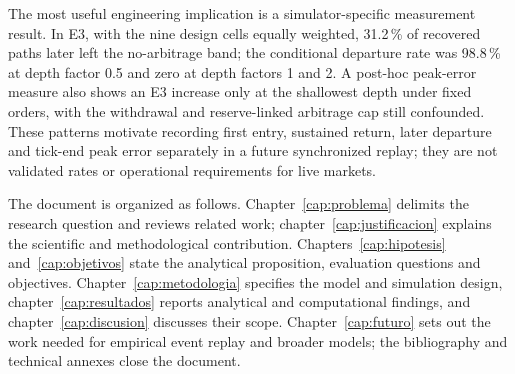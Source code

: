 The most useful engineering implication is a simulator-specific measurement result. In E3, with the nine design cells equally weighted, 31.2\,\% of recovered paths later left the no-arbitrage band; the conditional departure rate was 98.8\,\% at depth factor 0.5 and zero at depth factors 1 and 2. A post-hoc peak-error measure also shows an E3 increase only at the shallowest depth under fixed orders, with the withdrawal and reserve-linked arbitrage cap still confounded. These patterns motivate recording first entry, sustained return, later departure and tick-end peak error separately in a future synchronized replay; they are not validated rates or operational requirements for live markets.

The document is organized as follows. Chapter~\ref{cap:problema} delimits the research question and reviews related work; chapter~\ref{cap:justificacion} explains the scientific and methodological contribution. Chapters~\ref{cap:hipotesis} and~\ref{cap:objetivos} state the analytical proposition, evaluation questions and objectives. Chapter~\ref{cap:metodologia} specifies the model and simulation design, chapter~\ref{cap:resultados} reports analytical and computational findings, and chapter~\ref{cap:discusion} discusses their scope. Chapter~\ref{cap:futuro} sets out the work needed for empirical event replay and broader models; the bibliography and technical annexes close the document.
